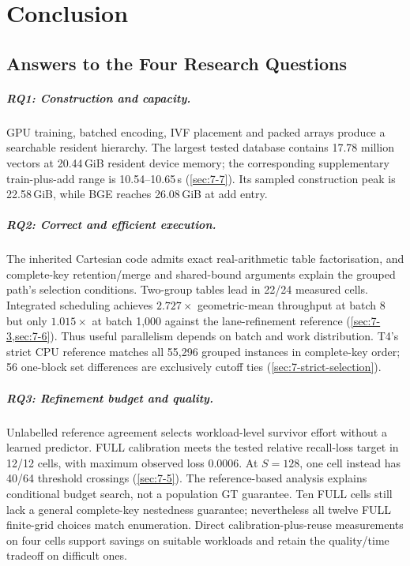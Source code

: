 \chapter{Conclusion}
\label{ch:conclusion}

\section{Answers to the Four Research Questions}
\label{sec:9-1}
\paragraph{RQ1: Construction and capacity.}
GPU training, batched encoding, IVF placement and packed arrays produce a
searchable resident hierarchy. The largest tested database contains
17.78 million vectors at 20.44\,GiB resident device memory; the corresponding
supplementary train-plus-add range is 10.54--10.65\,s
(\cref{sec:7-7}). Its sampled construction peak is 22.58\,GiB, while
BGE reaches 26.08\,GiB at add entry.

\paragraph{RQ2: Correct and efficient execution.}
The inherited Cartesian code admits exact real-arithmetic table
factorisation, and complete-key retention/merge and shared-bound arguments
explain the grouped path's selection conditions. Two-group tables lead in
22/24 measured cells. Integrated scheduling achieves $2.727\times$
geometric-mean throughput at batch 8 but only $1.015\times$ at batch 1,000
against the lane-refinement reference (\cref{sec:7-3,sec:7-6}). Thus useful
parallelism depends on batch and work distribution. T4's strict CPU
reference matches all 55,296 grouped instances in complete-key order;
56 one-block set differences are exclusively cutoff ties
(\cref{sec:7-strict-selection}).

\paragraph{RQ3: Refinement budget and quality.}
Unlabelled reference agreement selects workload-level survivor effort
without a learned predictor. FULL calibration meets the tested relative
recall-loss target in 12/12 cells, with maximum observed loss 0.0006.
At $S=128$, one cell instead has 40/64 threshold crossings
(\cref{sec:7-5}). The reference-based analysis explains conditional budget
search, not a population GT guarantee. Ten FULL cells still lack a
general complete-key nestedness guarantee; nevertheless all twelve FULL
finite-grid choices match enumeration. Direct calibration-plus-reuse
measurements on four cells support savings on suitable workloads and
retain the quality/time tradeoff on difficult ones.

